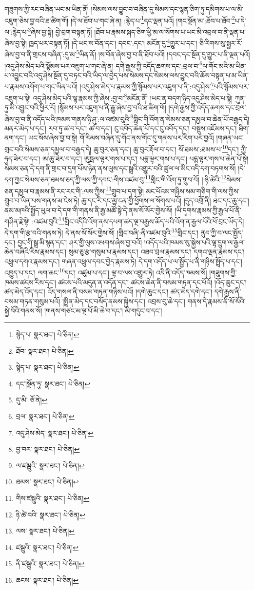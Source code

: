 གཟུགས་ཀྱི་རང་བཞིན་ཡང་མ་ཡིན་ནོ། །སེམས་ལས་བྱུང་བ་བཞིན་དུ་སེམས་དང་ལྷན་ཅིག་ཏུ་དམིགས་པ་ལ་མི་འཇུག་ཅེས་བྱ་བའི་ཐ་ཚིག་གོ། །དེ་ལ་ཐོབ་པ་གང་ཞེ་ན། :རྙེད་པ་\footnote{སྙེད་པ་  སྣར་ཐང་།  པེ་ཅིན། }དང་ལྡན་པའོ། །གང་སྔོན་མ་:ཐོབ་པ་ཐོབ་\footnote{ཐོབ་  སྣར་ཐང་།  པེ་ཅིན། }པ་དེ་ལ་:རྙེད་པ་\footnote{སྙེད་པ་  སྣར་ཐང་།  པེ་ཅིན། }ཞེས་བྱ་སྟེ། བྱེ་བྲག་བསྟན་ཏོ། །ཐོབ་པ་རྣམས་སྐད་ཅིག་ཕྱི་མ་ལ་སོགས་པ་ཡང་མི་འབྲལ་བ་ནི་ལྡན་པ་ཞེས་བྱ་སྟེ། ཁྱད་པར་བསྟན་ཏོ། །དེ་ཡང་ས་བོན་དང་། དབང་:དང་། མངོན་དུ་\footnote{དང་།སྔོན་ཏུ་  སྣར་ཐང་།  པེ་ཅིན། }གྱུར་པ་དང་། ཅི་རིགས་སུ་སྦྱར་རོ་ཞེས་བྱ་བ་ནི་གྲངས་བཞིན་:དུ་མ་\footnote{དུ་མི་  ཅོ་ནེ། }ཡིན་ནོ། །ས་བོན་ཞེས་བྱ་བ་ནི་ཐོབ་པའོ། །དབང་དང་སྔོན་དུ་གྱུར་པ་ནི་ལྡན་པའོ། །འདུ་ཤེས་མེད་པའི་སྙོམས་པར་འཇུག་པ་གང་ཞེ་ན། དགེ་རྒྱས་ཀྱི་འདོད་ཆགས་དང་:བྲལ་བ་\footnote{བྲལ་  སྣར་ཐང་།  པེ་ཅིན། }ལ་གོང་མའི་མ་ཡིན་པ་འབྱུང་བའི་འདུ་ཤེས་སྔོན་དུ་བཏང་བའི་ཡིད་ལ་བྱེད་པས་སེམས་དང་སེམས་ལས་བྱུང་བའི་ཆོས་བསྟན་པ་མ་ཡིན་པ་རྣམས་འགོག་པ་གང་ཡིན་པའོ། །འདུ་ཤེས་མེད་པ་རྣམས་ཀྱི་སྙོམས་པར་འཇུག་པ་ནི་:འདུ་ཤེས་\footnote{འདུ་ཤེས་མེད་  སྣར་ཐང་།  པེ་ཅིན། }པའི་སྙོམས་པར་འཇུག་པ་སྟེ། འདུ་ཤེས་མེད་པའི་ལྷ་རྣམས་ཀྱི་ཞེས་:བྱ་བ་\footnote{བྱ་བར་  སྣར་ཐང་།  པེ་ཅིན། }མངོན་ནོ། །ཡང་ན་བདག་ཉིད་འདུ་ཤེས་མེད་པ་སྟེ། ཀུན་ཏུ་མི་འབྱུང་བའི་ཕྱིར་རོ། །སྙོམས་པར་འཇུག་པ་ནི་རྒྱུ་ཞེས་བྱ་བའི་ཐ་ཚིག་གོ། །དགེ་རྒྱས་ཀྱི་འདོད་ཆགས་དང་བྲལ་ཞེས་བྱ་བ་ནི་འདོད་པའི་ཁམས་གནས་ཉི་ཤུ་:ལ་འཛམ་བུའི་\footnote{ལ་ཛམྦུའི་  སྣར་ཐང་།  པེ་ཅིན། }གླིང་གི་འོག་ན་སེམས་ཅན་དམྱལ་བ་ཆེན་པོ་བརྒྱད་དེ། མནར་མེད་པ་དང་། རབ་ཏུ་ཚ་བ་དང་། ཚ་བ་དང་། ངུ་འབོད་ཆེན་པོ་དང་ངུ་འབོད་དང་། བསྡུས་འཇོམས་དང་། ཐིག་ནག་དང་། ཡང་སོས་ཞེས་བྱ་བ་སྟེ། གོ་རིམས་བཞིན་དུ་གོང་ནས་གོང་དུ་གནས་པར་རིག་པར་བྱའོ། །གཞན་ཡང་གྲང་བའི་སེམས་ཅན་དམྱལ་བ་བརྒྱད་དེ། ཆུ་བུར་ཅན་དང་། ཆུ་བུར་རྡོལ་བ་དང་། སོ་ཐམས་:ཐམས་པ་\footnote{ཐམས་  སྣར་ཐང་།  པེ་ཅིན། }དང་། ཀྱི་ཧུད་ཟེར་བ་དང་། ཨ་ཆུ་ཟེར་བ་དང་། ཨུཏྤལ་ལྟར་གས་པ་དང་། པདྨ་ལྟར་གས་པ་དང་། པདྨ་ལྟར་གས་པ་ཆེན་པོ་སྟེ། སེམས་ཅན་དེ་དག་ནི་གྲང་བ་དྲག་པོས་ཉེན་ནས་ལུས་དང་སྒྲའི་འགྱུར་བའི་ཚུལ་ལ་མིང་འདི་དག་བཏགས་སོ། །དེ་དག་ཀྱང་སེམས་ཅན་ཐམས་ཅད་ཀྱི་ལས་ཀྱི་དབང་:གིས་འཛམ་བུ་\footnote{གིས་ཛམྦུའི་  སྣར་ཐང་།  པེ་ཅིན། }གླིང་གི་འོག་ཏུ་གྲུབ་བོ། །:ཉི་ཚེའི་\footnote{ཉི་ཚེ་བའི་  སྣར་ཐང་།  པེ་ཅིན། }སེམས་ཅན་དམྱལ་བ་རྣམས་ནི་རང་རང་གི་:ལས་ཀྱིས་\footnote{ལས་  སྣར་ཐང་།  པེ་ཅིན། }གྲུབ་པ་དག་སྟེ། མང་པོའམ་གཉིས་སམ་གཅིག་གི་ལས་ཀྱིས་གྲུབ་བ་ཡིན་པས་གནས་མ་ངེས་ཏེ། ཆུ་དང་རི་དང་མྱ་ངན་གྱི་ཕྱོགས་ལ་སོགས་པའོ། །དུད་འགྲོ་ནི། ཐང་དང་ཆུ་དང་། ནམ་མཁའི་སྤྱོད་ཡུལ་བ་དེ་དག་གི་གནས་ནི་རྒྱ་མཚོ་སྟེ་དེ་ནས་སོ་སོར་གྱེས་སོ། །ཡི་དྭགས་རྣམས་ཀྱི་རྒྱལ་པོ་ནི་གཤིན་རྗེ་སྟེ། :འཛམ་བུའི་\footnote{ཛམྦུའི་  སྣར་ཐང་།  པེ་ཅིན། }གླིང་འདིའི་འོག་ནས་དཔག་ཚད་ལྔ་བརྒྱས་ཆོད་པའི་འོག་ན་རྒྱལ་པོའི་ཕོ་བྲང་ཡོད་དེ། དེ་དག་གི་རྩ་བའི་གནས་ཏེ། དེ་ནས་སོ་སོར་གྱེས་སོ། །གླིང་བཞི་:ནི་འཛམ་བུའི་\footnote{ནི་ཛམྦུའི་  སྣར་ཐང་།  པེ་ཅིན། }གླིང་དང་། ནུབ་ཀྱི་བ་ལང་སྤྱོད་དང་། བྱང་གི་སྒྲ་མི་སྙན་དང་། ཤར་གྱི་ལུས་འཕགས་ཞེས་བྱ་བའོ། །འདོད་པའི་ཁམས་སུ་སྐྱེས་པའི་ལྷ་དྲུག་ལ་རྒྱལ་ཆེན་བཞིའི་རིས་རྣམས་དང་། སུམ་ཅུ་རྩ་གསུམ་པ་རྣམས་དང་། འཐབ་བྲལ་རྣམས་དང་། དགའ་ལྡན་རྣམས་དང་། འཕྲུལ་དགའ་རྣམས་དང་། གཞན་འཕྲུལ་དབང་བྱེད་རྣམས་ཏེ། དེ་དག་འདོད་པ་ལ་སྤྱོད་པ་ནི་གཉིས་སྤྲོད་པ་དང་། འཁྱུད་པ་དང་། ལག་ཆང་\footnote{ཆངས་  སྣར་ཐང་།  པེ་ཅིན། }དང་། འཛུམ་པ་དང་། ལྟ་བ་ལས་འགྱུར་ཏེ། འདི་ནི་འདོད་ཁམས་སོ། །གཟུགས་ཀྱི་ཁམས་ཚངས་རིས་དང་། ཚངས་པའི་མདུན་ན་འདོན་དང་། ཚངས་ཆེན་ནི་བསམ་གཏན་དང་པོའོ། །འོད་ཆུང་དང་། ཚད་མེད་འོད་དང་། འོད་གསལ་ནི་བསམ་གཏན་གཉིས་པའོ། །དགེ་ཆུང་དང་། ཚད་མེད་དགེ་དང་། དགེ་རྒྱས་ནི་བསམ་གཏན་གསུམ་པའོ། །སྤྲིན་མེད་དང་བསོད་ནམས་སྐྱེས་དང་། འབྲས་བུ་ཆེ་དང་། གནས་དེ་རྣམས་ནི་སོ་སོའི་སྐྱེ་བོའི་གནས་སོ། །གནས་གཙང་མ་ལྔ་པོ་མི་ཆེ་བ་དང་། མི་གདུང་བ་དང་། 